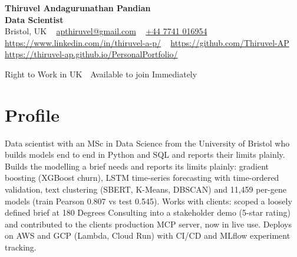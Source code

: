 \documentclass[a4paper,11pt]{article}
\begin{document}
\begin{center}
  {\LARGE\bfseries Thiruvel Andagurunathan Pandian} \\[3pt]
  {\color{headernavy}\small\textbf{Data Scientist}} \\[3pt]
  {\small
  Bristol, UK\nobreak\ \,\textbar\, \href{mailto:apthiruvel@gmail.com}{apthiruvel@gmail.com}\nobreak\ \,\textbar\, \href{tel:+447741016954}{+44 7741 016954}\nobreak\ \,\textbar\, \href{https://www.linkedin.com/in/thiruvel-a-p/}{https://www.linkedin.com/in/thiruvel-a-p/}\nobreak\ \,\textbar\, \href{https://github.com/Thiruvel-AP}{https://github.com/Thiruvel-AP}\nobreak\ \,\textbar\, \href{https://thiruvel-ap.github.io/PersonalPortfolio/}{https://thiruvel-ap.github.io/PersonalPortfolio/}}\par\vspace{4pt}
  \noindent{} Right to Work in UK \,\textbar\, Available to join Immediately
\end{center}

\section{Profile}
Data scientist with an MSc in Data Science from the University of Bristol who builds models end to end in Python and SQL and reports their limits plainly. Builds the modelling a brief needs and reports its limits plainly: gradient boosting (XGBoost churn), LSTM time-series forecasting with time-ordered validation, text clustering (SBERT, K-Means, DBSCAN) and 11,459 per-gene models (train Pearson 0.807 vs test 0.545). Works with clients: scoped a loosely defined brief at 180 Degrees Consulting into a stakeholder demo (5-star rating) and contributed to the client\textquotesingle{}s production MCP server, now in live use. Deploys on AWS and GCP (Lambda, Cloud Run) with CI/CD and MLflow experiment tracking.
\end{document}
